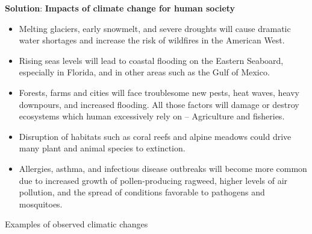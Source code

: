 \documentclass[
  openany]{book}
\newenvironment{solution}{ {\bfseries Solution}:}{}
\begin{document}
\begin{questions}
\begin{solution}
\textbf{Impacts of climate change for human society}

\begin{itemize}
\item Melting glaciers, early snowmelt, and severe droughts will cause dramatic water shortages and increase the risk of wildfires in the American West.
\item Rising seas levels will lead to coastal flooding on the Eastern Seaboard, especially in Florida, and in other areas such as the Gulf of Mexico. 
\item Forests, farms and cities will face troublesome new pests, heat waves, heavy downpours, and increased flooding. All those factors will damage or destroy ecosystems which human excessively rely on -- Agriculture and fisheries.
\item Disruption of habitats such as coral reefs and alpine meadows could drive many plant and animal species to extinction.
\item Allergies, asthma, and infectious disease outbreaks will become more common due to increased growth of pollen-producing ragweed, higher levels of air pollution, and the spread of conditions favorable to pathogens and mosquitoes.
\end{itemize}

Examples of observed climatic changes


\end{solution}
\end{questions}
\end{document}
